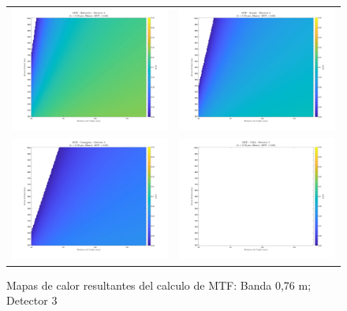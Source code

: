 \begin{landscape}
\begin{figure}[p]
\centering
\setlength{\tabcolsep}{2pt}
\renewcommand{\arraystretch}{0}

\begin{tabular}{cc}
\includegraphics[width=0.48\linewidth]{4.Payload/MTF/MTF_Lambda3_Detector6_Telescopio1_heatmap.jpg} &
\includegraphics[width=0.48\linewidth]{4.Payload/MTF/MTF_Lambda3_Detector6_Telescopio2_heatmap.jpg} \\
\includegraphics[width=0.48\linewidth]{4.Payload/MTF/MTF_Lambda3_Detector6_Telescopio3_heatmap.jpg} &
\includegraphics[width=0.48\linewidth]{4.Payload/MTF/MTF_Lambda3_Detector6_Telescopio4_heatmap.jpg} \\
\end{tabular}

\caption{Mapas de calor resultantes del calculo de MTF: Banda 0,76 \textmu m; Detector 3}
\end{figure}
\end{landscape}





